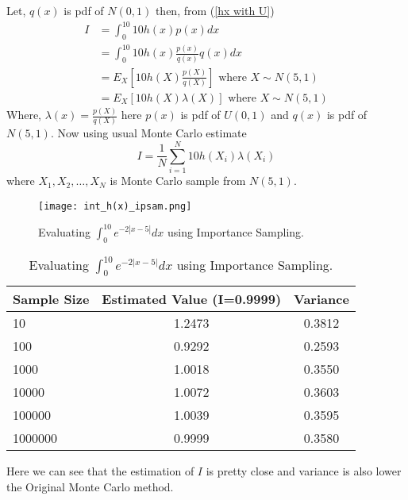 \begin{example}
	Let, $q(x)$ is pdf of $N(0,1)$ then, from (\ref{hx with U})
	\begin{align*}
		I & = \int_{0}^{10} 10h(x) p(x) dx                                            \\
		  & = \int_{0}^{10} 10 h(x) \frac{p(x)}{q(x)} q(x)dx                          \\
		  & = E_X\left[ 10 h(X) \frac{p(X)}{q(X)} \right] \text{ where } X\sim N(5,1) \\
		  & = E_X\left[ 10 h(X) \lambda(X) \right]\text{ where } X\sim N(5,1)
	\end{align*}
	Where, $\lambda(x) = \frac{p(X)}{q(X)}$ here $p(x)$ is pdf of $U(0,1)$ and $q(x)$ is pdf of $N(5,1)$. Now using usual Monte Carlo estimate
	\[
		I = \frac{1}{N} \sum_{i = 1}^{N} 10 h(X_i) \lambda(X_i)
	\]
	where $X_1, X_2,\ldots,X_N$ is Monte Carlo sample from $N(5,1)$.
	\begin{figure}[H]
		\centering
		\texttt{[image: int\_h(x)\_ipsam.png]}
		\caption{Evaluating $\int_{0}^{10} e^{-2 |x-5|} dx$ using Importance Sampling.}
		\label{fig:impotrancesampling1}
	\end{figure}
	\begin{table}[h]
		\centering
		\begin{tabular}{lcc}
			\hline
			\textbf{Sample Size} & \textbf{Estimated Value (I=0.9999)} & \textbf{Variance} \\
			\hline
			10                   & 1.2473                              & 0.3812            \\
			100                  & 0.9292                              & 0.2593            \\
			1000                 & 1.0018                              & 0.3550            \\
			10000                & 1.0072                              & 0.3603            \\
			100000               & 1.0039                              & 0.3595            \\
			1000000              & 0.9999                              & 0.3580            \\
			\hline
		\end{tabular}
		\caption{Evaluating $\int_{0}^{10} e^{-2 |x-5|} dx$ using Importance Sampling.}
		\label{tab:mytable}
	\end{table}
	Here we can see that the estimation of $I$ is pretty close and variance is also
	lower the Original Monte Carlo method.
\end{example}


